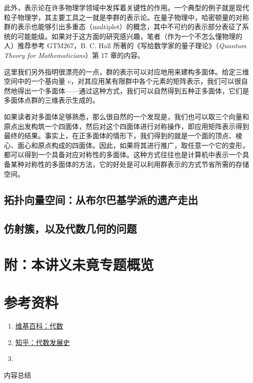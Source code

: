 \documentclass{ctexbook}
\begin{document}
此外，表示论在许多物理学领域中发挥着关键性的作用。一个典型的例子就是现代粒子物理学，其主要工具之一就是李群的表示论。在量子物理中，哈密顿量的对称群的表示也能够引出多重态（multiplet）的概念，其中不可约的表示部分表征了系统的可能能级。如果对于这方面的研究感兴趣，笔者（作为一个不怎么懂物理的人）推荐参考 GTM267，B. C. Hall 所著的《写给数学家的量子理论》（\textit{Quantum Theory for Mathematicians}）第 17 章的内容。

这里我们另外指明很漂亮的一点，群的表示可以对应地用来建构多面体。给定三维空间中的一个基向量 $v$，对其应用某有限群中各个元素的矩阵表示，我们可以很自然地得出一个多面体——通过这种方式，我们可以自然得到五种正多面体，它们是多面体点群的三维表示生成的。

如果读者对多面体足够熟悉，那么很自然的一个发现是，我们也可以取三个向量和原点出发构筑一个四面体，然后对这个四面体进行对称操作，即应用矩阵表示得到最终的结果。事实上，在正多面体的情形下，我们得到的就是一个面的顶点、棱心、面心和原点构成的四面体。因此，如果将其进行推广，取任意一个它的变形，都可以得到一个具备对应对称性的多面体。这种方式往往也是计算机中表示一个具备某种对称性的多面体的方法，它的好处是可以利用群表示的方式节省所需的存储空间。

\subsection{拓扑向量空间：从布尔巴基学派的遗产走出}

\subsection{仿射簇，以及代数几何的问题}

\section*{附：本讲义未竟专题概览}


\section*{参考资料}
\begin{enumerate}
    \item \href{https://zh.wikipedia.org/wiki/%E4%BB%A3%E6%95%B0}{维基百科：代数}
    \item \href{https://zhuanlan.zhihu.com/p/574858845}{知乎：代数发展史}
    \item 
\end{enumerate}
\vspace{2ex}
\centerline{\heiti \Large 内容总结}
\end{document}
